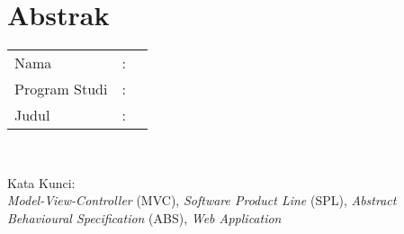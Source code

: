 %
%
%

\chapter*{Abstrak}

\vspace*{0.2cm}

\noindent \begin{tabular}{l l p{10cm}}
	Nama&: & \penulis \\
	Program Studi&: & \program \\
	Judul&: & \judul \\
\end{tabular} \\ 

\vspace*{0.5cm}

\vspace*{0.2cm}

\noindent Kata Kunci: \\ 
\noindent \textit{Model-View-Controller} (MVC), \textit{Software Product Line} (SPL), \textit{Abstract Behavioural Specification} (ABS), \textit{Web Application}\\ 

\newpage